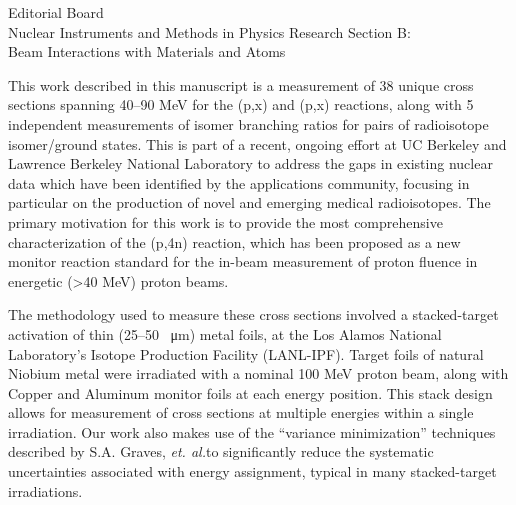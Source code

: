 \documentclass{letter} %
\begin{document}
\begin{letter}{Editorial Board \\
Nuclear Instruments and Methods in Physics Research Section B: \\
Beam Interactions with Materials and Atoms}
 
\noindent This work described in this manuscript is a measurement of 38 unique cross sections spanning 40--90 MeV for the (p,x) and (p,x) reactions, along with 5 independent measurements of isomer branching ratios for pairs of radioisotope isomer/ground states. This is part of a recent, ongoing effort at UC Berkeley and Lawrence Berkeley National Laboratory to address the gaps in existing nuclear data which have been identified by the applications community, focusing in particular on the production of novel and emerging medical radioisotopes. The primary motivation for this work is to provide the most comprehensive characterization of the (p,4n) reaction, which has been proposed as a new monitor reaction standard for the in-beam measurement  of proton fluence in energetic (\textgreater 40 MeV) proton beams.

\noindent The methodology used to measure these cross sections involved a stacked-target activation of thin (25--50 \SI{}{\micro\meter}) metal foils,  at the Los Alamos National Laboratory's Isotope Production Facility (LANL-IPF). Target foils of natural Niobium metal were irradiated with a nominal 100 MeV proton beam, along with Copper and Aluminum monitor foils at each energy position.   This stack design allows for measurement of cross sections at multiple energies within a single irradiation. Our work also makes use of the ``variance minimization'' techniques described by S.A. Graves, \emph{et. al.}\footnotemark[7] to significantly reduce the systematic uncertainties associated with energy assignment, typical in many stacked-target irradiations.




\end{letter}
\end{document}
